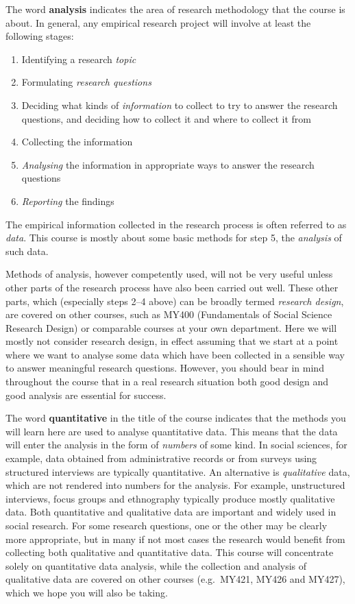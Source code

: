 \documentclass[11pt,a4paper,openany]{book}
\begin{document}
The word \textbf{analysis} indicates the area of research methodology
that the course is about. In general, any empirical research project
will involve at least the following stages:

\begin{enumerate}
\def\labelenumi{\arabic{enumi}.}
\item
  Identifying a research \emph{topic}
\item
  Formulating \emph{research questions}
\item
  Deciding what kinds of \emph{information} to collect to try to answer
  the research questions, and deciding how to collect it and where to
  collect it from
\item
  Collecting the information
\item
  \emph{Analysing} the information in appropriate ways to answer the
  research questions
\item
  \emph{Reporting} the findings
\end{enumerate}

The empirical information collected in the research process is often
referred to as \emph{data}. This course is mostly about some basic
methods for step 5, the \emph{analysis} of such data.

Methods of analysis, however competently used, will not be very useful
unless other parts of the research process have also been carried out
well. These other parts, which (especially steps 2--4 above) can be
broadly termed \emph{research design}, are covered on other courses,
such as MY400 (Fundamentals of Social Science Research Design) or
comparable courses at your own department. Here we will mostly not
consider research design, in effect assuming that we start at a point
where we want to analyse some data which have been collected in a
sensible way to answer meaningful research questions. However, you
should bear in mind throughout the course that in a real research
situation both good design and good analysis are essential for success.

The word \textbf{quantitative} in the title of the course indicates that
the methods you will learn here are used to analyse quantitative data.
This means that the data will enter the analysis in the form of
\emph{numbers} of some kind. In social sciences, for example, data
obtained from administrative records or from surveys using structured
interviews are typically quantitative. An alternative is
\emph{qualitative} data, which are not rendered into numbers for the
analysis. For example, unstructured interviews, focus groups and
ethnography typically produce mostly qualitative data. Both quantitative
and qualitative data are important and widely used in social research.
For some research questions, one or the other may be clearly more
appropriate, but in many if not most cases the research would benefit
from collecting both qualitative and quantitative data. This course will
concentrate solely on quantitative data analysis, while the collection
and analysis of qualitative data are covered on other courses
(e.g.~MY421, MY426 and MY427), which we hope you will also be taking.
\end{document}
